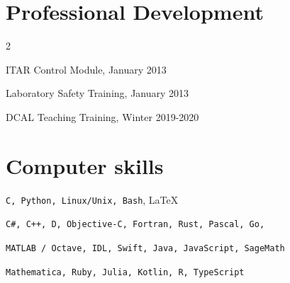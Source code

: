 \documentclass[a4paper,sans]{moderncv}
\begin{document}
    \section{Professional Development}
        \begin{itemize}
            \begin{multicols}{2}
                \item ITAR Control Module, January 2013
                \item Laboratory Safety Training, January 2013
                \item DCAL Teaching Training, Winter 2019-2020
            \end{multicols}
        \end{itemize}
    \section{Computer skills}
        \texttt{C, Python, Linux/Unix, Bash}, \LaTeX\par
        \texttt{C\#, C++, D, Objective-C, Fortran, Rust, Pascal, Go,}\par
        \makebox[2.3cm][l]{\phantom{Intermediate}}
        \texttt{MATLAB / Octave, IDL, Swift, Java, JavaScript, SageMath}\par
        \texttt{Mathematica, Ruby, Julia, Kotlin, R, TypeScript}\par
\end{document}
